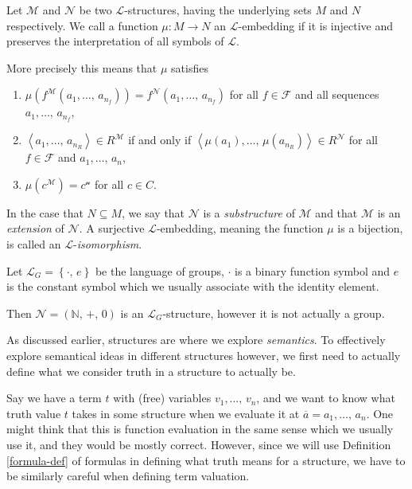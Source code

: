 \documentclass[../../main.tex]{subfiles}
\begin{document}
\begin{definition}\label{structure-embedding-def}\cite[Definition 1.1.3]{Mar02}
    Let $\mathcal{M}$ and $\mathcal{N}$ be two $\mathcal{L}$-structures, having the underlying sets $M$ and $N$ respectively.
    We call a function $\mu: M \to N$ an $\mathcal{L}$-embedding if it is injective and preserves the interpretation of all symbols of $\mathcal{L}$.

    More precisely this means that $\mu$ satisfies
    \begin{enumerate}[label=(\roman*)]
        \item $\mu\left(f^\mathcal{M}(a_1,\ldots,\, a_{n_f})\right) = f^\mathcal{N}(a_1,\ldots,\, a_{n_f})$ 
        for all $f \in \mathcal{F}$ and all sequences $a_1,\ldots,\, a_{n_f}$,
        \item $\left<a_1,\ldots,\, a_{n_R}\right> \in R^\mathcal{M}$ if and only if $\left<\mu(a_1),\ldots,\, \mu(a_{n_R})\right> \in R^\mathcal{N}$ 
        for all $f \in \mathcal{F}$ and $a_1,\ldots,\, a_n$,
        \item $\mu(c^\mathcal{M}) = c^\mathcal{n}$ for all $c \in C$.
    \end{enumerate}
    In the case that $N \subseteq M$, 
    we say that $\mathcal{N}$ is a \textit{substructure} of $\mathcal{M}$ and that $\mathcal{M}$ is an \textit{extension} of $\mathcal{N}$.
    A surjective $\mathcal{L}$-embedding, meaning the function $\mu$ is a bijection, is called an $\mathcal{L}$-\emph{isomorphism}.
\end{definition}

\begin{example}\cite[p.8]{Mar02}
    Let $\mathcal{L}_G = \left\{\cdot,\, e\right\}$ be the language of groups, 
    $\cdot$ is a binary function symbol and $e$ is the constant symbol which we usually associate with the identity element.

    Then $\mathcal{N} = \left(\mathbb{N},\, +,\, 0\right)$ is an $\mathcal{L}_G$-structure, however it is not actually a group.
\end{example}

As discussed earlier, structures are where we explore \textit{semantics}.
To effectively explore semantical ideas in different structures however, 
we first need to actually define what we consider truth in a structure to actually be.

Say we have a term $t$ with (free) variables $v_1,\ldots,\, v_n$,
and we want to know what truth value $t$ takes in some structure when we evaluate it at $\overline{a} = a_1,\ldots,\, a_n$.
One might think that this is function evaluation in the same sense which we usually use it, and they would be mostly correct.
However, since we will use Definition \ref{formula-def} of formulas in defining what truth means for a structure,
we have to be similarly careful when defining term valuation.
\end{document}
